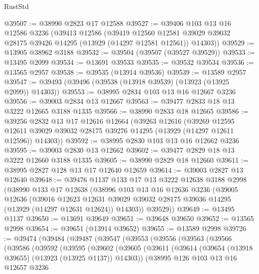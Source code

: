 \begin{lexlean}{RustStd}
\begin{coremodule}
@39507 := @38990 @2823 @17 @12588
@39527 := @39406
    @103
    @13
    @16
    @12586
    @3236
    (@39413
      @12586
      (@39419
        @12560
        @12581
        @39029
        @39032
        @28175
        @39426
        @14295
        (@13929 (@14297 @12581 @12561))
        @14303))
@39529 := @13905 @38962 @3188
@39532 := @39504 (@39507 (@39527 @39529))
@39533 := @13495 @2099
@39534 := @13691 @39533
@39535 := @39532 @39534
@39536 := @13565 @2957
@39538 := @39535 (@13914 @39536)
@39539 := @13589 @2957
@39547 := @39493 (@39496 (@39538 (@13918 @39539) (@13923 (@13925 @2099)) @14303))
@39553 := @38995 @2834 @103 @13 @16 @12667 @3236
@39556 := @39003 @2834 @13 @12667
@39563 := @39477 @2833 @18 @13 @3222 @12665 @3188 @1335
@39566 := @38990 @2833 @18 @12665
@39586 := @39256
    @2832
    @13
    @17
    @12616
    @12664
    (@39263
      @12616
      (@39269
        @12595
        @12611
        @39029
        @39032
        @28175
        @39276
        @14295
        (@13929 (@14297 @12611 @12596))
        @14303))
@39592 := @38995 @2830 @103 @13 @16 @12662 @3236
@39595 := @39003 @2830 @13 @12662
@39602 := @39477 @2829 @18 @13 @3222 @12660 @3188 @1335
@39605 := @38990 @2829 @18 @12660
@39611 := @38995 @2827 @128 @13 @17 @12640 @12659
@39614 := @39003 @2827 @13 @12640
@39648 := @39476
    @1137
    @133
    @17
    @13
    @3222
    @12638
    @3188
    @2998
    (@38990
      @133
      @17
      @12638
      (@38996
        @103
        @13
        @16
        @12636
        @3236
        (@39005
          @12636
          (@39016
            @12623
            @12631
            @39029
            @39032
            @28175
            @39036
            @14295
            (@13929 (@14297 @12631 @12624))
            @14303))
        @39529))
@39649 := @13495 @1137
@39650 := @13691 @39649
@39651 := @39648 @39650
@39652 := @13565 @2998
@39654 := @39651 (@13914 @39652)
@39655 := @13589 @2998
@39726 := @39474
    (@39484
      (@39487
        (@39547
          (@39553
            (@39556
              (@39563
                (@39566
                  (@39586
                    (@39592
                      (@39595
                        (@39602
                          (@39605
                            (@39611
                              (@39614 (@39654 (@13918 @39655) (@13923 (@13925 @1137)) @14303))
                              (@38995
                                @126
                                @103
                                @13
                                @16
                                @12657
                                @3236

\end{coremodule}
\end{lexlean}
